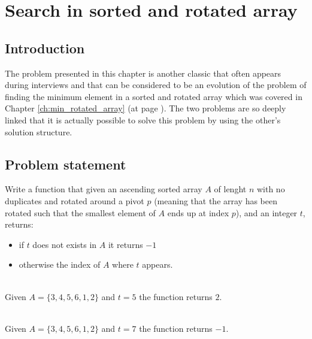 %

\chapter{Search in sorted and rotated array}
\label{ch:search_sorted_rotated_array}
\section*{Introduction}
The problem presented in this chapter is another classic that often appears during interviews and that can be considered to be an evolution of the problem of finding the minimum element in a sorted and rotated array which was covered in Chapter \ref{ch:min_rotated_array} (at page \pageref{ch:min_rotated_array}).
The two problems are so deeply linked that it is actually possible to solve this problem by using the other's solution structure. 

\section{Problem statement}
\begin{exercise}
Write a function that given an ascending sorted array $A$ of lenght $n$ with no duplicates and rotated around a pivot $p$ (meaning that the array has been rotated such that the smallest element of $A$ ends up at index $p$), and an integer $t$, returns:
\begin{itemize}
	\item if $t$ does not exists in $A$ it returns $-1$ 
	\item otherwise the index of $A$ where $t$ appears.
\end{itemize}


	\begin{example}
		\hfill \\
		Given $A=\{3,4,5,6,1,2\}$ and $t=5$ the function returns $2$.
		
	\end{example}

	\begin{example}
		\hfill \\
		Given $A=\{3,4,5,6,1,2\}$ and $t=7$ the function returns $-1$.
		
	\end{example}
\end{exercise}

